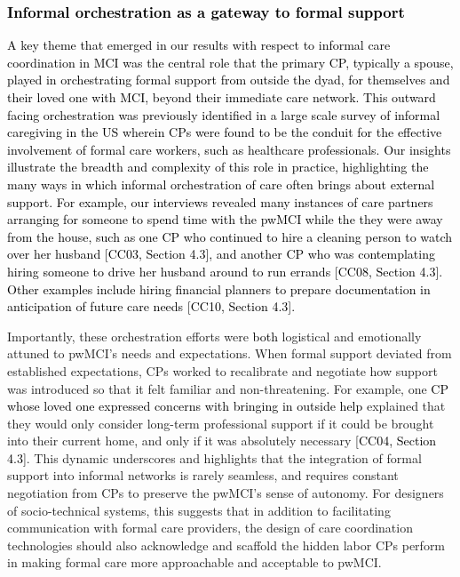 \documentclass[acmsmall]{acmart}
\begin{document}
\textcolor{black}{\subsubsection{Informal orchestration as a gateway to formal support}
A key theme that emerged \textcolor{black}{in our results} with respect to informal care coordination in MCI was the central role that the primary CP, typically a spouse, played in orchestrating formal support from outside the dyad, \textcolor{black}{for themselves and their loved one with MCI, beyond their immediate care network.} This outward facing orchestration was previously identified in a large scale survey of informal caregiving in the US \cite{schurgin2021isolation} wherein CPs were found to be the conduit for the effective involvement of formal care workers, such as healthcare professionals. Our insights illustrate the breadth and complexity of this role in practice, highlighting the many ways in which informal orchestration of care often brings about \textcolor{black}{external} support. For example, our interviews revealed many instances of care partners arranging for someone to spend time with the pwMCI while the they were away from the house, such as \textcolor{black}{one} CP who continued to hire a cleaning person to watch over her husband \textcolor{black}{[CC03, Section 4.3]}, and another CP who was contemplating hiring someone to drive her husband around to run errands \textcolor{black}{[CC08, Section 4.3]}. Other examples include hiring financial planners to prepare documentation in anticipation of future care needs \textcolor{black}{[CC10, Section 4.3]}.
}

Importantly, these orchestration efforts were \textcolor{black}{both} logistical and emotionally attuned to pwMCI’s needs and expectations. When formal support deviated from established expectations, CPs worked to recalibrate and negotiate how support was introduced so that it felt familiar and non-threatening. For example, one \textcolor{black}{CP whose loved one expressed concerns with bringing \textcolor{black}{in} outside help} explained that they would only consider long-term professional support if it could be brought into their current home, and only if it was absolutely necessary \textcolor{black}{[CC04, Section 4.3]}. This dynamic underscores and highlights that the integration of formal support into informal networks is rarely seamless, and requires constant negotiation from CPs to preserve the pwMCI’s sense of autonomy. For designers of socio-technical systems, this suggests that in addition to facilitating communication with formal care providers, the design of care coordination technologies should also acknowledge and scaffold the hidden labor CPs perform in making formal care more approachable and acceptable to pwMCI.
\end{document}
